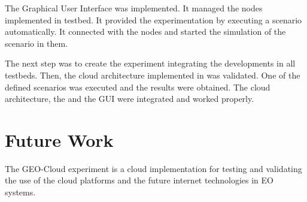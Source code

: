 The Graphical User Interface was implemented. It managed the nodes implemented
in \vw testbed. It provided the experimentation by executing a scenario automatically. It connected with the \vw nodes and
started the simulation of the scenario in them.

The next step was to create the experiment integrating  the developments in
all testbeds. Then, the cloud architecture implemented in \bonfire was
validated. One of the defined scenarios was executed and the results were
obtained.  The cloud architecture, the \sss and the \ac{GUI} were integrated
and worked properly.


\section{Future Work}

The GEO-Cloud experiment is a cloud implementation for testing and validating the
use of the cloud platforms and the future internet technologies in \ac{EO}
systems.

